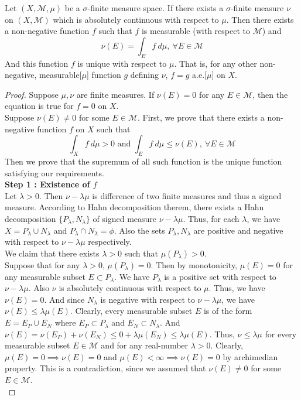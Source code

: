 \begin{theorem}
	Let $(X,\mathcal{M},\mu)$ be a $\sigma$-finite measure space.
	If there exists a $\sigma$-finite measure $\nu$ on $(X,\mathcal{M})$ which is absolutely continuous with respect to $\mu$.
	Then there exists a non-negative function $f$ such that $f$ is measurable (with respect to $\mathcal{M}$) and
	\begin{equation}
		\nu(E) = \int_E f \ d\mu,\ \forall E \in \mathcal{M} 
	\end{equation}
	And this function $f$ is unique with respect to $\mu$. That is, for any other non-negative, measurable[$\mu$] function $g$ defining $\nu$, $f = g$ a.e.[$\mu$] on $X$.
\end{theorem}
\begin{proof}
	Suppose $\mu,\nu$ are finite measures.
	If $\nu(E) = 0$ for any $E \in \mathcal{M}$, then the equation is true for $f = 0$ on $X$.\\

	Suppose $\nu(E) \ne 0$ for some $E \in \mathcal{M}$.
	First, we prove that there exists a non-negative function $f$ on $X$ such that
	$$ \int_X f \ d\mu > 0 \text{ and } \int_E f \ d\mu \le \nu(E),\ \forall E \in \mathcal{M} $$
	Then we prove that the supremum of all such function is the unique function satisfying our requirements.\\
	
	\textbf{Step 1 : Existence of $f$}\\
	Let $\lambda > 0$.
	Then $\nu - \lambda\mu$ is difference of two finite measures and thus a signed measure.
	According to Hahn decomposition therem, there exists a Hahn decomposition $\{ P_\lambda,N_\lambda\}$ of signed measure $\nu - \lambda\mu$.
	Thus, for each $\lambda$, we have $X = P_\lambda \cup N_\lambda$ and $P_\lambda \cap N_\lambda = \phi$.
	Also the sets $P_\lambda, N_\lambda$ are positive and negative with respect to $\nu-\lambda\mu$ respectively.\\

	We claim that there exists $\lambda > 0$ such that $\mu(P_\lambda) > 0$.\\
	Suppose that for any $\lambda > 0$, $\mu(P_\lambda) = 0$.
	Then by monotonicity, $\mu(E) = 0$ for any measurable subset $E \subset P_\lambda$.
	We have $P_\lambda$ is a positive set with respect to $\nu-\lambda\mu$. 
	Also $\nu$ is absolutely continuous with respect to $\mu$.
	Thus, we have $\nu(E)=0$.
	And since $N_\lambda$ is negative with respect to $\nu-\lambda\mu$, we have $\nu(E) \le \lambda\mu(E)$.
	Clearly, every measurable subset $E$ is of the form $E = E_P \cup E_N$ where $E_P \subset P_\lambda$ and $E_N \subset N_\lambda$.
	And $\nu(E)=\nu(E_P) + \nu(E_N) \le 0+\lambda\mu(E_N) \le \lambda\mu(E)$.
	Thus, $\nu \le \lambda\mu$ for every measurable subset $E \in \mathcal{M}$ and for any real-number $\lambda > 0$.
	Clearly, $\mu(E) = 0 \implies \nu(E) = 0$ and $\mu(E) < \infty \implies \nu(E) = 0$ by archimedian property.
	This is a contradiction, since we assumed that $\nu(E) \ne 0$ for some $E \in \mathcal{M}$.\\


\end{proof}

